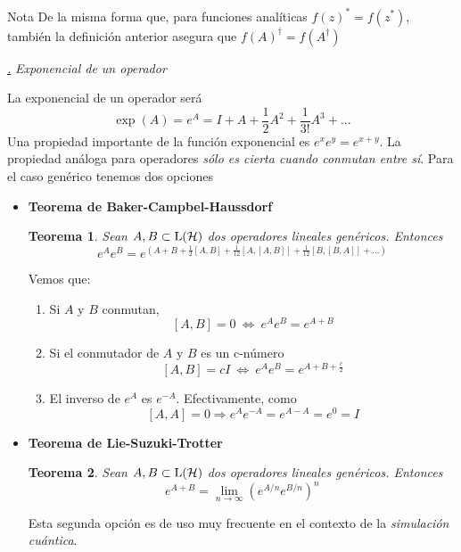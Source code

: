 \documentclass[a4paper,11pt]{book} %
\newtheorem{teorema_contador}{Teorema}
\newcommand{\Teorema}[1]{
		\begin{mybox_gray2}{}
			\begin{teorema_contador}
				 #1 
			\end{teorema_contador} 
		\end{mybox_gray2}
	}
\numberwithin{equation}{chapter}
\def\subsubiContadorIt{\par\addtocounter{subsubsection}{1}\underline{\it\thesubsubsection.}\hskip0.5cm \setcounter{subsubsubsectionIt}{0}}
\newcommand{\SubsubiIt}[1]{
		\subsubiContadorIt \textit{#1}
	}
\newcounter{subsubsubsectionIt}[subsubsection]
\begin{document}
\begin{mybox_blue}{Nota}
De la misma forma que, para funciones analíticas $f(z)^* = f(z^*)$, también la definición anterior asegura que $f(A)^\dagger = f(A^\dagger)$
\end{mybox_blue}


			\SubsubiIt{Exponencial de un operador}

La exponencial de un operador será
	\begin{equation}
	\exp(A) = e^A = I + A + \frac{1}{2} A^2 + \frac{1}{3!} A^3 + ...
	\end{equation}
Una propiedad importante de la función exponencial es  $e^xe^y = e^{x+y}$. La propiedad análoga para operadores \textit{sólo es cierta cuando conmutan entre sí}. Para el caso genérico tenemos dos opciones
\begin{itemize}
	\item \textbf{Teorema de Baker-Campbel-Haussdorf}
	\Teorema{
	Sean $A,B\subset{\rm L}(\mathcal{H})$ dos operadores lineales genéricos. Entonces
		\begin{equation}
	e^A e^B = e^{\left({A+B + \frac{1}{2}[A,B] + \frac{1}{12}[A,[A,B]]+ \frac{1}{12}[B,[B,A]] + ...}\right)}
		\end{equation}
	}

	Vemos que:
	\begin{enumerate}
		\item Si $A$ y $B$ conmutan, 
		$$[A,B]=0 ~\Leftrightarrow ~e^A e^B = e^{A+B}$$
		
		\item Si el conmutador de $A$ y $B$  es un c-número 
		$$[A,B]= c I  ~\Leftrightarrow ~  e^A e^B = e^{A+B + \frac{c}{2}}$$
		
		\item El inverso de $e^A$ es $e^{-A}$. Efectivamente, como 
		$$[A,A]=0 \Rightarrow e^A e^{-A} = e^{A-A} = e^0 = I$$

	\end{enumerate}
	
	\item \textbf{Teorema de Lie-Suzuki-Trotter}
	
	\Teorema{Sean $A,B\subset{\rm L}(\mathcal{H})$ dos operadores lineales genéricos. Entonces
		\begin{equation}
		e^{A+B} = \lim_{n\to\infty} \left(e^{{A/n}} e^{B/n}\right)^n
		\end{equation}
	}
	Esta segunda opción es de uso muy frecuente en el contexto de la \textit{simulación cuántica}. 
\end{itemize}
\end{document}

